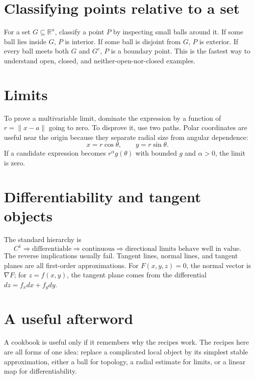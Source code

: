 

\section{Classifying points relative to a set}

For a set $G\subseteq\mathbb R^n$, classify a point $P$ by inspecting small balls around it.  If some ball lies inside $G$, $P$ is interior.  If some ball is disjoint from $G$, $P$ is exterior.  If every ball meets both $G$ and $G^c$, $P$ is a boundary point.  This is the fastest way to understand open, closed, and neither-open-nor-closed examples.

\section{Limits}

To prove a multivariable limit, dominate the expression by a function of $r=\|x-a\|$ going to zero.  To disprove it, use two paths.  Polar coordinates are useful near the origin because they separate radial size from angular dependence:
\[
  x=r\cos\theta,\qquad y=r\sin\theta.
\]
If a candidate expression becomes $r^\alpha g(\theta)$ with bounded $g$ and $\alpha>0$, the limit is zero.

\section{Differentiability and tangent objects}

The standard hierarchy is
\[
  C^1\Rightarrow\text{differentiable}\Rightarrow\text{continuous}\Rightarrow\text{directional limits behave well in value}.
\]
The reverse implications usually fail.  Tangent lines, normal lines, and tangent planes are all first-order approximations.  For $F(x,y,z)=0$, the normal vector is $\nabla F$; for $z=f(x,y)$, the tangent plane comes from the differential $dz=f_xdx+f_ydy$.

\section{A useful afterword}

A cookbook is useful only if it remembers why the recipes work.  The recipes here are all forms of one idea: replace a complicated local object by its simplest stable approximation, either a ball for topology, a radial estimate for limits, or a linear map for differentiability.



